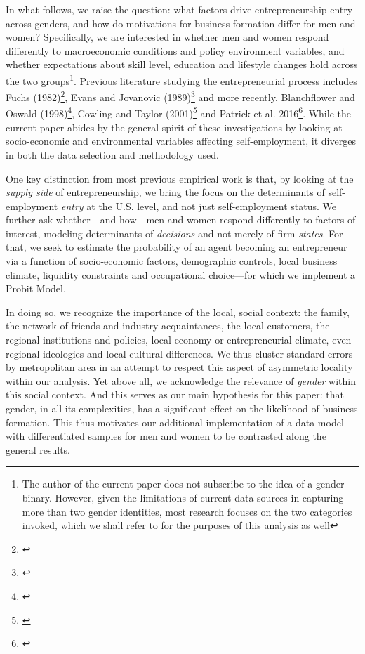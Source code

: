 In what follows, we raise the question: what factors drive entrepreneurship entry across genders, and how do motivations for business formation differ for men and women? Specifically, we are interested in whether men and women respond differently to macroeconomic conditions and policy environment variables, and whether expectations about skill level, education and lifestyle changes hold across the two groups\footnote{The author of the current paper does not subscribe to the idea of a gender binary. However, given the limitations of current data sources in capturing more than two gender identities, most research focuses on the two categories invoked, which we shall refer to for the purposes of this analysis as well}. Previous literature studying the entrepreneurial process includes Fuchs (1982)\footnote{\cite{}}, Evans and Jovanovic (1989)\footnote{\cite{EvansJovanovic1989}} and more recently, Blanchflower and Oswald (1998)\footnote{\cite{BlanchflowerOswald1998}}, Cowling and Taylor (2001)\footnote{\cite{CowlingTaylor2001}} and Patrick et al. 2016\footnote{\cite{PatrickStephensWeinstein2016}}.  While the current paper abides by the general spirit of these investigations by looking at socio-economic and environmental variables affecting self-employment, it diverges in both the data selection and methodology used. 

One key distinction from most previous empirical work is that, by looking at the \textit{supply side} of entrepreneurship, we bring the focus on the determinants of self-employment \textit{entry} at the U.S. level, and not just self-employment status. We further ask whether---and how---men and women respond differently to factors of interest, modeling determinants of \textit{decisions} and not merely of firm \textit{states}. For that, we seek to estimate the probability  of an agent becoming an entrepreneur via a function of socio-economic factors, demographic controls, local business climate, liquidity constraints and occupational choice---for which we implement a Probit Model. 

In doing so, we recognize the importance of the local, social context: the family, the network of friends and industry acquaintances, the local customers, the regional institutions and policies, local economy or entrepreneurial climate, even regional ideologies and local cultural differences. We thus cluster standard errors by metropolitan area in an attempt to respect this aspect of asymmetric locality within our analysis. Yet above all, we acknowledge the relevance of \textit{gender} within this social context. And this serves as our main hypothesis for this paper: that gender, in all its complexities,  has a significant effect on the likelihood of business formation. This thus motivates our additional implementation of a data model with differentiated samples for men and women to be contrasted along the general results. 

